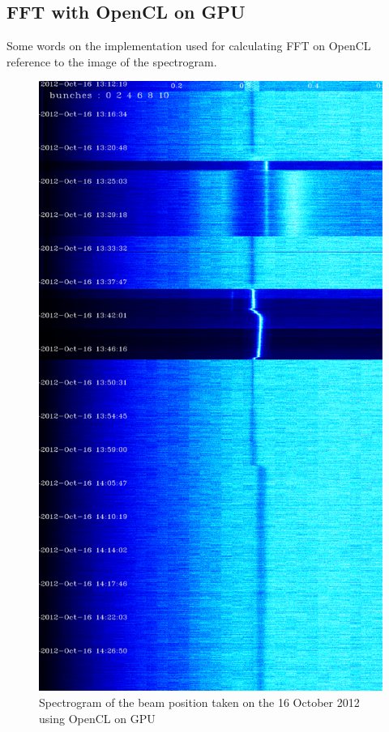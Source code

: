    \subsection{FFT with OpenCL on GPU}

   Some words on the implementation used for calculating FFT on OpenCL reference to the image of the spectrogram.

\begin{figure}
\caption{Spectrogram of the beam position taken on the 16 October 2012 using OpenCL on GPU}
\centering
\includegraphics[scale=0.3]
{md-121016-vb1-m1-6bunches-10acc-gputopia-cl-gpu.pdf}
\end{figure}

